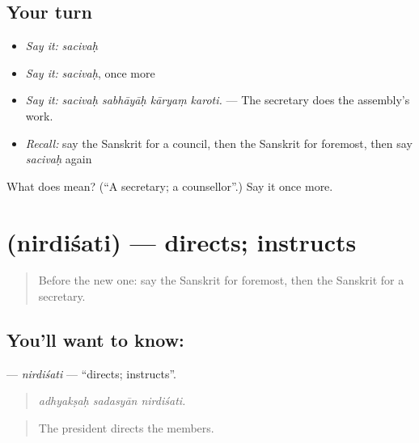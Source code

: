 \subsection*{Your turn}
\begin{itemize}
\raggedright
  \item \emph{Say it:} \emph{sacivaḥ}
  \item \emph{Say it:} \emph{sacivaḥ}, once more
  \item \emph{Say it:} \emph{sacivaḥ sabhāyāḥ kāryaṃ karoti.} — The secretary does the assembly's work.
  \item \emph{Recall:} say the Sanskrit for a council, then the Sanskrit for foremost, then say \emph{sacivaḥ} again
\end{itemize}

\begin{tcolorbox}[breakable,colback=teal!4,colframe=teal!35!black,title={Before you move on}]
What does  mean? (\textquotedblleft{}A secretary; a counsellor\textquotedblright{}.) Say it once more.
\end{tcolorbox}
\section[\texorpdfstring{\sk{निर्दिशति} (nirdiśati)}{निर्दिशति (nirdiśati)}]{ (nirdiśati) — directs; instructs}

\label{lesson:SA-C357-nirdisati}



\begin{quote}
Before the new one: say the Sanskrit for foremost, then the Sanskrit for a secretary.
\end{quote}

\subsection*{You'll want to know: }
\textbf{} — \emph{nirdiśati} — \textquotedblleft{}directs; instructs\textquotedblright{}.

\begin{quote}
  
\end{quote}

\begin{quote}
\emph{adhyakṣaḥ sadasyān nirdiśati.}
\end{quote}

\begin{quote}
The president directs the members.
\end{quote}

